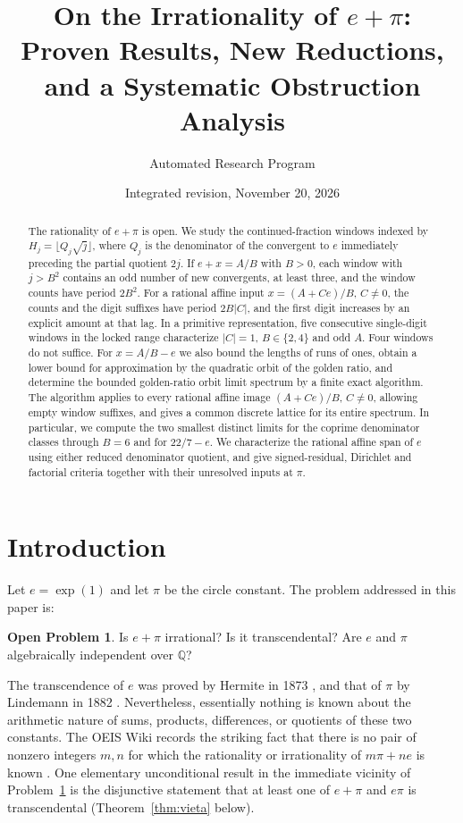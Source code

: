 \documentclass[11pt]{amsart}
\title[On the Irrationality of $e+\pi$]{On the Irrationality of $e+\pi$: Proven Results, New Reductions, and a Systematic Obstruction Analysis}
\author{Automated Research Program}
\date{Integrated revision, November 20, 2026}
\theoremstyle{definition}
\newtheorem{problem}[theorem]{Open Problem}
\theoremstyle{remark}
\numberwithin{equation}{section}
\newcommand{\Q}{\mathbb{Q}}
\newcommand{\ee}{e}
\begin{document}
\begin{abstract}
The rationality of $e+\pi$ is open. We study the continued-fraction
windows indexed by $H_j=\lfloor Q_j\sqrt j\rfloor$, where $Q_j$ is the
denominator of the convergent to $e$ immediately preceding the partial
quotient $2j$. If $e+x=A/B$ with $B>0$, each window with $j>B^2$
contains an odd number of new convergents, at least three, and the
window counts have period $2B^2$. For a rational affine input
$x=(A+Ce)/B$, $C\ne0$, the counts and the digit suffixes have period
$2B|C|$, and the first digit increases by an explicit amount at that lag.
In a primitive representation, five consecutive single-digit windows
in the locked range characterize $|C|=1$, $B\in\{2,4\}$ and odd $A$.
Four windows do not suffice. For $x=A/B-e$ we also bound the lengths
of runs of ones, obtain a lower bound for approximation by the
quadratic orbit of the golden ratio, and determine the bounded golden-ratio orbit limit spectrum by a finite
exact algorithm. The algorithm applies to every rational affine image
$(A+Ce)/B$, $C\ne0$, allowing empty window suffixes, and gives a common
discrete lattice for its entire spectrum. In particular, we compute the two smallest distinct
limits for the coprime denominator classes through $B=6$ and for $22/7-e$.
We characterize the rational affine span of $e$ using
either reduced denominator quotient, and give signed-residual,
Dirichlet and factorial criteria together with their unresolved inputs
at $\pi$.
\end{abstract}

\maketitle

\section{Introduction}\label{sec:intro}

Let $\ee=\exp(1)$ and let $\pi$ be the circle constant. The problem addressed in this paper is:

\begin{problem}\label{prob:main}
Is $e+\pi$ irrational? Is it transcendental? Are $e$ and $\pi$ algebraically independent over $\Q$?
\end{problem}

The transcendence of $\ee$ was proved by Hermite in 1873 \cite{Hermite1873}, and that of $\pi$ by Lindemann in 1882 \cite{Lindemann1882}. Nevertheless, essentially nothing is known about the arithmetic nature of sums, products, differences, or quotients of these two constants. The OEIS Wiki records the striking fact that there is no pair of nonzero integers $m,n$ for which the rationality or irrationality of $m\pi+n\ee$ is known \cite{OEIS}. One elementary unconditional result in the immediate vicinity of Problem~\ref{prob:main} is the disjunctive statement that at least one of $e+\pi$ and $e\pi$ is transcendental (Theorem~\ref{thm:vieta} below).
\end{document}
